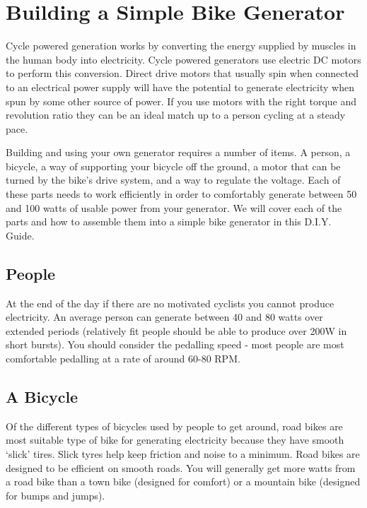 \documentclass{article}
\theoremstyle{definition}
\theoremstyle{definition}
\theoremstyle{remark}
\begin{document}


\newpage

{\color{blue}\section{Building a Simple Bike Generator}} %
\label{sec:building_a_simple_bike_generator}

  Cycle powered generation works by converting the energy supplied by muscles in the human body into electricity. Cycle powered generators use electric DC motors to perform this conversion. Direct drive motors that usually spin when connected to an electrical power supply will have the potential to generate electricity when spun by some other source of power. If you use motors with the right torque and revolution ratio they can be an ideal match up to a person cycling at a steady pace.

  Building and using your own generator requires a number of items. A person, a bicycle, a way of supporting your bicycle off the ground, a motor that can be turned by the bike’s drive system, and a way to regulate the voltage. Each of these parts needs to work efficiently in order to comfortably generate between 50 and 100 watts of usable power from your generator. We will cover each of the parts and how to assemble them into a simple bike generator in this D.I.Y. Guide.

  {\color{blue}\subsection{People}} %
  \label{sub:people}

    At the end of the day if there are no motivated cyclists you cannot produce electricity. An average person can generate between 40 and 80 watts over extended periods (relatively fit people should be able to produce over 200W in short bursts). You should consider the pedalling speed - most people are most comfortable pedalling at a rate of around 60-80 RPM.
  

  {\color{blue}\subsection{A Bicycle}} %
  \label{sub:a_bicycle}

    Of the different types of bicycles used by people to get around, road bikes are most suitable type of bike for generating electricity because they have smooth ‘slick’ tires. Slick tyres help keep friction and noise to a minimum. Road bikes are designed to be efficient on smooth roads. You will generally get more watts from a road bike than a town bike (designed for comfort) or a mountain bike (designed for bumps and jumps).
  
\end{document}
